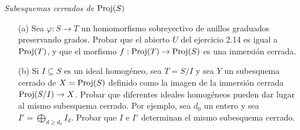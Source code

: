\documentclass[twoside]{article}
\begin{document}
%
%
\begin{ejercicio}{3.12}\emph{Subesquemas cerrados de $\operatorname{Proj}(S)$}
\begin{enumerate}
\item[(a)]Sea $\varphi:S\to T$ un homomorfismo sobreyectivo de anillos graduados preservando grados. Probar que el abierto $U$ del ejercicio 2.14 es igual a $\operatorname{Proj}(T)$, y que el morfismo $f:\operatorname{Proj}(T)\to\operatorname{Proj}(S)$ es una inmersión cerrada.
\item[(b)] Si $I\subseteq S$ es un ideal homogéneo, sea $T=S/I$ y sea $Y$ un subesquema cerrado de $X=\operatorname{Proj}(S)$ definido como la imagen de la inmersión cerrada $\operatorname{Proj}(S/I)\to X$. Probar que diferentes ideales homogéneos pueden dar lugar al mismo subesquema cerrado. Por ejemplo, sea $d_0$ un entero y sea $I'=\bigoplus_{d\geq d_0}I_d$. Probar que $I$ e $I'$ determinan el mismo subesquema cerrado.
\end{enumerate}
\end{ejercicio}
\end{document}
